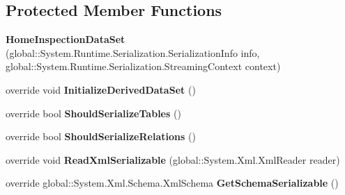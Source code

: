 \subsection*{Protected Member Functions}
\begin{DoxyCompactItemize}
\item 
\mbox{\label{class_a_f_h___scheduler_1_1_home_inspection_data_set_a77cb4d3e09e1fb77c76e9261b38c7593}} 
{\bfseries Home\+Inspection\+Data\+Set} (global\+::\+System.\+Runtime.\+Serialization.\+Serialization\+Info info, global\+::\+System.\+Runtime.\+Serialization.\+Streaming\+Context context)
\item 
\mbox{\label{class_a_f_h___scheduler_1_1_home_inspection_data_set_a6120721cf0c82454380523ef92afae05}} 
override void {\bfseries Initialize\+Derived\+Data\+Set} ()
\item 
\mbox{\label{class_a_f_h___scheduler_1_1_home_inspection_data_set_a6dfe050a9dc09e1c9f5075bffbe5439c}} 
override bool {\bfseries Should\+Serialize\+Tables} ()
\item 
\mbox{\label{class_a_f_h___scheduler_1_1_home_inspection_data_set_aee996083c3845ad8f03e9febaa3c6d00}} 
override bool {\bfseries Should\+Serialize\+Relations} ()
\item 
\mbox{\label{class_a_f_h___scheduler_1_1_home_inspection_data_set_a5a46438abdc35a8084fcf69f3b2bd864}} 
override void {\bfseries Read\+Xml\+Serializable} (global\+::\+System.\+Xml.\+Xml\+Reader reader)
\item 
\mbox{\label{class_a_f_h___scheduler_1_1_home_inspection_data_set_a4969ebfcfacba25d028b3a9da4c99a01}} 
override global\+::\+System.\+Xml.\+Schema.\+Xml\+Schema {\bfseries Get\+Schema\+Serializable} ()
\end{DoxyCompactItemize}

